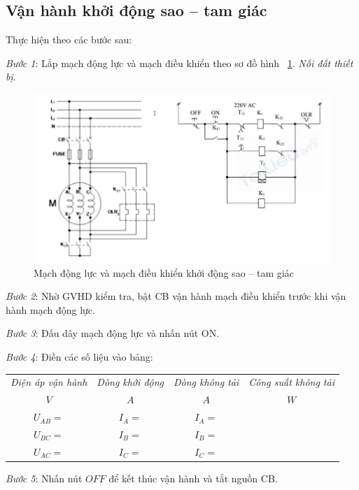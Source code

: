 \documentclass[13pt,a4paper]{extarticle}
\begin{document}
\subsection{Vận hành khởi động sao -- tam giác}
Thực hiện theo các bước sau:
\begin{list}{--}{}
\item \textit{Bước 1}: Lắp mạch động lực và mạch điều khiển theo sơ đồ hình ~\ref{Fig:1}. \textit{Nối đất thiết bị}.
\begin{figure}[!h]
\begin{center}
\includegraphics[scale=.6]{1}
\end{center}
\caption{Mạch động lực và mạch điều khiển khởi động sao -- tam giác}\label{Fig:1}
\end{figure}
\item \textit{Bước 2}: Nhờ GVHD kiểm tra, bật CB vận hành mạch điều khiển trước khi vận hành mạch động lực. 
\item \textit{Bước 3}: Đấu dây mạch động lực và nhấn nút ON.
\item \textit{Bước 4}: Điền các số liệu vào bảng:
\begin{center}
\begin{tabular}{|c|c|c|c|}\hline
\textit{Điện áp vận hành} & \textit{Dòng khởi động} & \textit{Dòng không tải} & \textit{Công suất không tải}\\ 
$V$ & $A$ & $A$ & $W$ \\ \hline
$U_{AB}= $&$I_A = $ & $I_A = $ & \\ \hline
$U_{BC}= $&$I_B = $ & $I_B = $ & \\ \hline
$U_{AC}= $&$I_C = $ & $I_C = $ & \\ \hline
\end{tabular}
\end{center}
\item \textit{Bước 5}: Nhấn nút $OFF$ để kết thúc vận hành và tắt nguồn CB.
\end{list}
\end{document}
